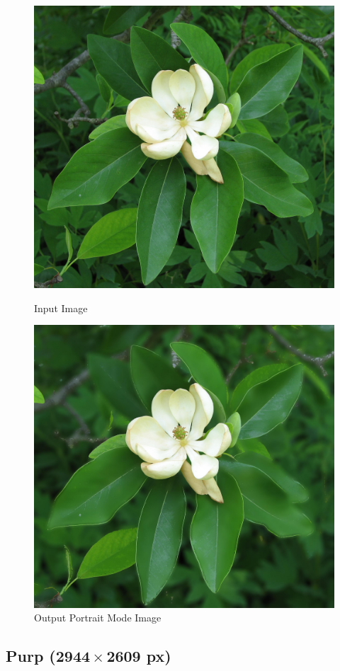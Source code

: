 \documentclass[12pt]{article}
\begin{document}
\begin{figure}[!htb]
    \begin{minipage}{0.48\textwidth}
        \centering
        \includegraphics[width=0.6\linewidth]{flower.jpg}
        \caption{Input Image}
    \end{minipage}\hfill
    \begin{minipage}{0.48\textwidth}
        \centering
        \includegraphics[width=0.6\linewidth]{flower_portrait.jpg}
        \caption{Output Portrait Mode Image}
    \end{minipage}\hfill
\end{figure}
\subsection{Purp ($\mathbf{2944 \times 2609}$ px)}
\end{document}
